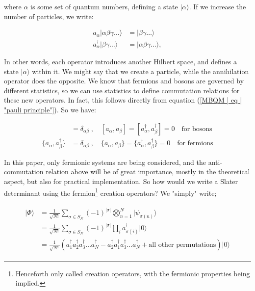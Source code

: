 \documentclass[10pt,twoside]{report}
\begin{document}
	\noindent where $\alpha$ is some set of quantum numbers, defining a state $|\alpha\rangle$. If we increase the number of particles, we write:
	
	\begin{align}
		a_\alpha|\alpha\beta\gamma\ldots\rangle &= |\beta\gamma\ldots\rangle\\
		a_\alpha^\dagger|\beta\gamma\ldots\rangle &= |\alpha\beta\gamma\ldots\rangle,
	\end{align}
	
	In other words, each operator introduces another Hilbert space, and defines a state $|\alpha\rangle$ within it. We might say that we create a particle, while the annihilation operator does the opposite. We know that fermions and bosons are governed by different statistics, so we can use statistics to define commutation relations for these new operators. In fact, this follows directly from equation (\ref{MBQM | eq | "pauli principle"}). So we have:
	
	\begin{align}
		[a_\alpha,a_\beta^\dagger] &= \delta_{\alpha\beta} \:,\quad [a_\alpha,a_\beta] = [a_\alpha^\dagger,a_\beta^\dagger] = 0 \quad \text{for bosons}\\
		\{a_\alpha,a_\beta^\dagger\} &= \delta_{\alpha\beta} \:,\quad \{a_\alpha,a_\beta\} = \{a_\alpha^\dagger,a_\beta^\dagger\} = 0 \quad \text{for fermions}
	\end{align}
	
	In this paper, only fermionic systems are being considered, and the anti-commutation relation above will be of great importance, mostly in the theoretical aspect, but also for practical implementation.
	So how would we write a Slater determinant using the fermion\footnote{Henceforth only called creation operators, with the fermionic properties being implied.} creation operators? We "simply" write;
	
	\begin{align}
	\begin{split}
		|\Phi\rangle &= \frac{1}{\sqrt{N!}}\sum_{\sigma\in S_N} (-1)^{|\sigma|}\bigotimes_{n=1}^N |\psi_{\sigma(n)}\rangle \\
		&=\frac{1}{\sqrt{N!}}\sum_{\sigma \in S_N}(-1)^{|\sigma|}\prod_i a_{\sigma(i)}^\dagger|0\rangle\\
		&= \frac{1}{\sqrt{N!}}\left(a_1^\dagger a_2^\dagger a_3^\dagger\ldots a_N^\dagger - a_2^\dagger a_1^\dagger a_3^\dagger\ldots a_N^\dagger + \text{all other permutations}\right)|0\rangle
		\end{split}
		\label{MBQM | eq | "slater determinant"}
	\end{align}
	
\end{document}
